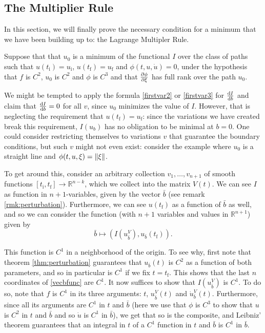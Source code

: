 \documentclass{article}
\theoremstyle{plain}
\theoremstyle{plain}
\theoremstyle{nonumberplain}
\theoremstyle{empty}
\newcommand{\R}{\mathbb{R}}
\newcommand{\tstart}{\mathrm{i}}
\newcommand{\tend}{\mathrm{f}}
\DeclarePairedDelimiter\norm{\lVert}{\rVert}
\newcommand{\vecb}{{\bar{b}}}
\begin{document}
\subsection{The Multiplier Rule}\label{sec:multrule}

In this section, we will finally prove the necessary condition for a minimum that we have been building up to: the Lagrange Multipler Rule.

Suppose that that $u_0$ is a minimum of the functional $I$ over the class of paths such that $u(t_\tstart) = u_\tstart$, $u(t_\tend) = u_\tend$ and $\phi(t,u,\dot u) = 0$, under the hypothesis that $f$ is $C^2$, $u_0$ is $C^2$ and $\phi$ is $C^3$ and that $\diffp \phi \xi$ has full rank over the path $u_0$.

We might be tempted to apply the formula \eqref{firstvar2} or \eqref{firstvar3} for $\diff I b$ and claim that $\diff I b = 0$ for all $v$, since $u_0$ minimizes the value of $I$. However, that is neglecting the requirement that $u(t_\tend) = u_\tend$: since the variations we have created break this requirement, $I(u_b)$ has no obligation to be minimal at $b = 0$. One could consider restricting themselves to variations $v$ that guarantee the boundary conditions, but such $v$ might not even exist: consider the example where $u_0$ is a straight line and $\phi(t,u,\xi) = \norm \xi$.

To get around this, consider an arbitrary collection $v_1, \dots, v_{n+1}$ of smooth functions $[t_\tstart, t_\tend] \to \R^{n-k}$, which we collect into the matrix $V(t)$. We can see $I$ as function in $n+1$-variables, given by the vector $\vecb$ (see remark \ref{rmk:perturbation}). Furthermore, we can see $u(t_\tend)$ as a function of $\vecb$ as well, and so we can consider the function (with $n+1$ variables and values in $\R^{n+1}$) given by
\begin{equation}\label{vecbfunc}
\vecb \mapsto (I(u_\vecb^V), u_\vecb(t_\tend)).
\end{equation}

This function is $C^1$ in a neighborhood of the origin. To see why, first note that theorem \ref{thm:perturbation} guarantees that $u_\vecb(t)$ is $C^2$ as a function of both parameters, and so in particular is $C^1$ if we fix $t = t_\tend$. This shows that the last $n$ coordinates of \eqref{vecbfunc} are $C^1$. It now suffices to show that $I(u_\vecb^V)$ is $C^1$. To do so, note that $f$ is $C^1$ in its three arguments: $t$, $u_\vecb^V(t)$ and $\dot u_\vecb^V(t)$. Furthermore, since all its arguments are $C^1$ in $t$ and $\vecb$ (here we use that $\phi$ is $C^3$ to show that $u$ is $C^2$ in $t$ and $\vecb$ and so $\dot u$ is $C^1$ in $\vecb$), we get that so is the composite, and Leibniz' theorem guarantees that an integral in $t$ of a $C^1$ function in $t$ and $\vecb$ is $C^1$ in $\vecb$.
\end{document}

